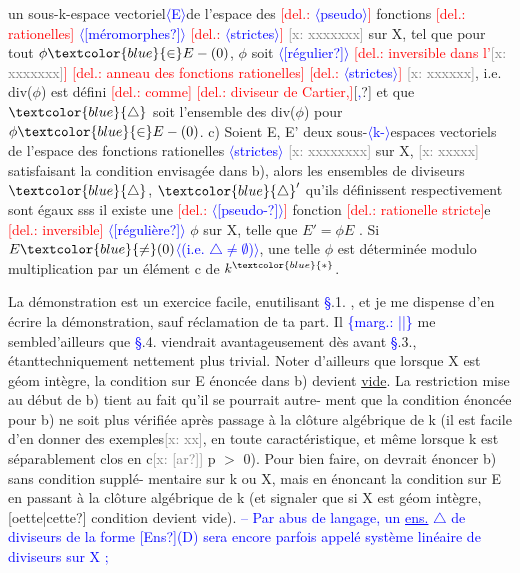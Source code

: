 \documentclass[11pt]{article}
\newcommand{\scanpage}[1]{\par\bigskip\noindent{\small\sffamily[scan #1]}\par}
\newcommand{\mspage}[1]{{\small\sffamily[p.\,#1]}}
\newcommand{\hand}[1]{\textcolor{blue}{#1}}
\newcommand{\inserted}[2][]{\textcolor{blue}{$\langle$#2$\rangle$}}
\newcommand{\margin}[1]{\textcolor{blue}{\{\textsf{marg.:} #1\}}}
\newcommand{\deleted}[1]{\textcolor{red}{[\textsf{del.:} #1]}}
\newcommand{\xout}[1]{\textcolor{gray}{[\textsf{x:} #1]}}
\newcommand{\uline}[1]{\underline{#1}}
\newcommand{\unsure}[1]{[#1?]}
\begin{document}
\mspage{132}

\clearpage
\scanpage{25/133}
\mspage{36}

un sous-k-espace vectoriel\inserted{E}de l'espace des \deleted{\inserted{pseudo}} fonctions \deleted{rationelles} \inserted{\unsure{méromorphes}} \deleted{\inserted[typed]{strictes}} \xout{xxxxxxx}
sur X, tel que pour tout $\phi \hand{\in} E-(0)$, $\phi$ soit \inserted{\unsure{régulier}} \deleted{inversible dans l'\xout{xxxxxxx}}
\deleted{anneau des fonctions rationelles} \deleted{\inserted[typed]{strictes}} \xout{xxxxxx}, i.e. div($\phi$) est défini \deleted{comme}
\deleted{diviseur de Cartier,}\unsure{\hand{,}} et que $\hand{\triangle}$ soit l'ensemble des div($\phi$) pour $\phi \hand{\in} E-(0)$.
c) Soient E, E' deux sous-\inserted[typed]{k-}espaces vectoriels de l'espace des
fonctions rationelles \inserted[typed]{strictes} \xout{xxxxxxxx} sur X, \xout{xxxxx} satisfaisant la condition
envisagée dans b), alors les ensembles de diviseurs $\hand{\triangle}$, $\hand{\triangle}'$ qu'ils
définissent respectivement sont égaux sss il existe une \deleted{\inserted{\unsure{pseudo-}}} fonction
\deleted{rationelle stricte}e \deleted{inversible} \inserted{\unsure{régulière}} $\phi$ sur X, telle que $E' = \phi E$ . Si $E\hand{\neq}(0)$\inserted{(i.e. $\triangle \neq \emptyset$)}, une
telle $\phi$ est déterminée modulo multiplication par un élément c de $k^{\hand{*}}$.

La démonstration est un exercice facile, enutilisant \hand{\S}.1. , et je
me dispense d'en écrire la démonstration, sauf réclamation de ta part. Il
\margin{||} me sembled'ailleurs que \hand{\S}.4. viendrait avantageusement dès avant \hand{\S}.3.,
étanttechniquement nettement plus trivial. Noter d'ailleurs que lorsque
X est géom intègre, la condition sur E énoncée dans b) devient \uline{vide}.
La restriction mise au début de b) tient au fait qu'il se pourrait autre-%
ment que la condition énoncée pour b) ne soit plus vérifiée après passage
à la clôture algébrique de k (il est facile d'en donner des exemples\xout{xx},
en toute caractéristique, et même lorsque k est séparablement clos en
c\xout{\unsure{ar}} p $>$ 0). Pour bien faire, on devrait énoncer b) sans condition supplé-%
mentaire sur k ou X, mais en énoncant la condition sur E en passant à la
clôture algébrique de k (et signaler que si X est géom intègre, \unsure{oette|cette}
condition devient vide). \hand{-- Par abus de langage, un}
\hand{\uline{ens.} $\triangle$ de diviseurs de la forme \unsure{Ens}(D) sera}
\hand{encore parfois appelé système linéaire de diviseurs}
\hand{sur X ;}
\end{document}
